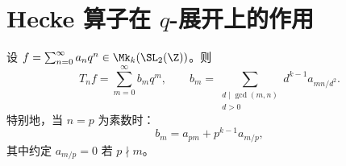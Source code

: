 \section{Hecke 算子在 $q$-展开上的作用}
\label{sec:hecke-on-qexp}

\begin{theorem}
\label{thm:hecke-on-q-exp}
设 $f = \sum_{n=0}^{\infty} a_n q^n \in \Mk_k(\SL_2(\Z))$。则
\[
  T_n f = \sum_{m=0}^{\infty} b_m q^m,
  \qquad b_m = \sum_{\substack{d \mid \gcd(m,n) \\ d > 0}} d^{k-1} a_{mn/d^2}.
\]
特别地，当 $n = p$ 为素数时：
\[
  \boxed{b_m = a_{pm} + p^{k-1} a_{m/p},}
\]
其中约定 $a_{m/p} = 0$ 若 $p \nmid m$。
\end{theorem}



